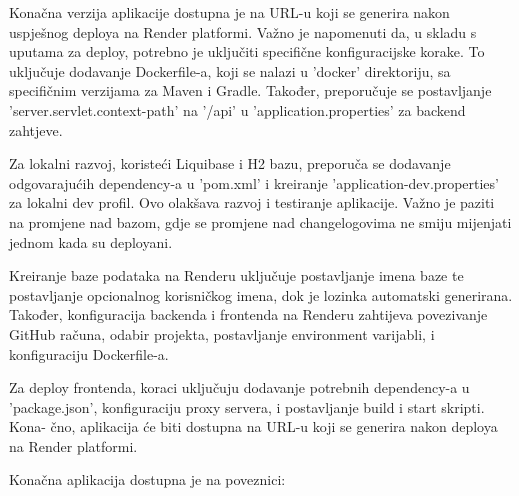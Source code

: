 		Konačna verzija aplikacije dostupna je na URL-u koji se generira nakon uspješnog deploya na Render platformi. Važno je napomenuti da, u skladu s uputama za deploy, potrebno je uključiti specifične konfiguracijske korake. To uključuje dodavanje Dockerfile-a, koji se nalazi u 'docker' direktoriju, sa specifičnim verzijama za Maven i Gradle. Također, preporučuje se postavljanje 'server.servlet.context-path' na '/api' u 'application.properties' za backend zahtjeve.

		Za lokalni razvoj, koristeći Liquibase i H2 bazu, preporuča se dodavanje odgovarajućih dependency-a u 'pom.xml' i kreiranje 'application-dev.properties' za lokalni dev profil. Ovo olakšava razvoj i testiranje aplikacije. Važno je paziti na promjene nad bazom, gdje se promjene nad changelogovima ne smiju mijenjati jednom kada su deployani.

		Kreiranje baze podataka na Renderu uključuje postavljanje imena baze te postavljanje opcionalnog korisničkog imena, dok je lozinka automatski generirana. Također, konfiguracija backenda i frontenda na Renderu zahtijeva povezivanje GitHub računa, odabir projekta, postavljanje environment varijabli, i konfiguraciju Dockerfile-a.

		Za deploy frontenda, koraci uključuju dodavanje potrebnih dependency-a u 'package.json', konfiguraciju proxy servera, i postavljanje build i start skripti. Kona- čno, aplikacija će biti dostupna na URL-u koji se generira nakon deploya na Render platformi.

		Konačna aplikacija dostupna je na poveznici:

		\eject